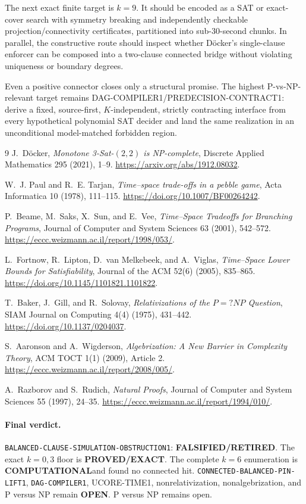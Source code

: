 \documentclass[11pt]{article}
\newcommand{\OPEN}{\textbf{OPEN}}
\newcommand{\EXACT}{\textbf{PROVED/EXACT}}
\newcommand{\COMP}{\textbf{COMPUTATIONAL}}
\newcommand{\RETIRED}{\textbf{FALSIFIED/RETIRED}}
\begin{document}
The next exact finite target is $k=9$.  It should be encoded as a SAT or
exact-cover search with symmetry breaking and independently checkable
projection/connectivity certificates, partitioned into sub-30-second chunks.
In parallel, the constructive route should inspect whether D\"ocker's
single-clause enforcer can be composed into a two-clause connected bridge
without violating uniqueness or boundary degrees.

Even a positive connector closes only a structural promise.  The highest
P-vs-NP-relevant target remains DAG-COMPILER1/PREDECISION-CONTRACT1: derive a
fixed, source-first, $K$-independent, strictly contracting interface from
every hypothetical polynomial SAT decider and land the same realization in
an unconditional model-matched forbidden region.

\begin{thebibliography}{9}
J.~D\"ocker, \emph{Monotone 3-Sat-$(2,2)$ is NP-complete},
Discrete Applied Mathematics 295 (2021), 1--9.
\url{https://arxiv.org/abs/1912.08032}.

W.~J. Paul and R.~E. Tarjan,
\emph{Time--space trade-offs in a pebble game},
Acta Informatica 10 (1978), 111--115.
\url{https://doi.org/10.1007/BF00264242}.

P.~Beame, M.~Saks, X.~Sun, and E.~Vee,
\emph{Time--Space Tradeoffs for Branching Programs},
Journal of Computer and System Sciences 63 (2001), 542--572.
\url{https://eccc.weizmann.ac.il/report/1998/053/}.

L.~Fortnow, R.~Lipton, D.~van Melkebeek, and A.~Viglas,
\emph{Time--Space Lower Bounds for Satisfiability},
Journal of the ACM 52(6) (2005), 835--865.
\url{https://doi.org/10.1145/1101821.1101822}.

T.~Baker, J.~Gill, and R.~Solovay,
\emph{Relativizations of the $P=?NP$ Question},
SIAM Journal on Computing 4(4) (1975), 431--442.
\url{https://doi.org/10.1137/0204037}.

S.~Aaronson and A.~Wigderson,
\emph{Algebrization: A New Barrier in Complexity Theory},
ACM TOCT 1(1) (2009), Article 2.
\url{https://eccc.weizmann.ac.il/report/2008/005/}.

A.~Razborov and S.~Rudich, \emph{Natural Proofs},
Journal of Computer and System Sciences 55 (1997), 24--35.
\url{https://eccc.weizmann.ac.il/report/1994/010/}.
\end{thebibliography}

\paragraph{Final verdict.}
\texttt{BALANCED-CLAUSE-SIMULATION-OBSTRUCTION1}: \RETIRED.  The exact
$k=0,3$ floor is \EXACT.  The complete $k=6$ enumeration is \COMP and found
no connected hit.  \texttt{CONNECTED-BALANCED-PIN-LIFT1},
\texttt{DAG-COMPILER1}, UCORE-TIME1, nonrelativization,
nonalgebrization, and P versus NP remain \OPEN.  P versus NP remains open.

\end{document}
